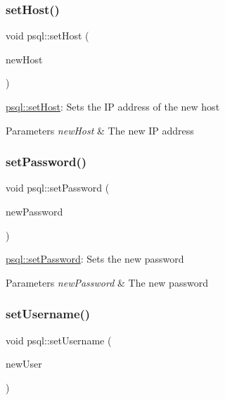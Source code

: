 \subsubsection{\texorpdfstring{set\+Host()}{setHost()}}
{\footnotesize\ttfamily void psql\+::set\+Host (\begin{DoxyParamCaption}\item[{Q\+String}]{new\+Host }\end{DoxyParamCaption})}



\hyperlink{classpsql_a96b3b9483f1a642c026d4b5cf505eb75}{psql\+::set\+Host}\+: Sets the IP address of the new host 


\begin{DoxyParams}{Parameters}
{\em new\+Host} & The new IP address \\
\hline
\end{DoxyParams}
\mbox{\label{classpsql_a6c29350037550b7e5a5bb8f439c405f3}} 
\subsubsection{\texorpdfstring{set\+Password()}{setPassword()}}
{\footnotesize\ttfamily void psql\+::set\+Password (\begin{DoxyParamCaption}\item[{Q\+String}]{new\+Password }\end{DoxyParamCaption})}



\hyperlink{classpsql_a6c29350037550b7e5a5bb8f439c405f3}{psql\+::set\+Password}\+: Sets the new password 


\begin{DoxyParams}{Parameters}
{\em new\+Password} & The new password \\
\hline
\end{DoxyParams}
\mbox{\label{classpsql_a1488a9e4909abd172651b7be240342cb}} 
\subsubsection{\texorpdfstring{set\+Username()}{setUsername()}}
{\footnotesize\ttfamily void psql\+::set\+Username (\begin{DoxyParamCaption}\item[{Q\+String}]{new\+User }\end{DoxyParamCaption})}



